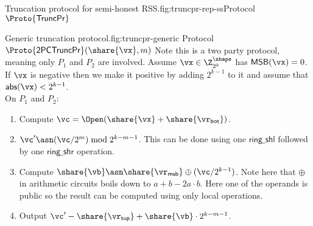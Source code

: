 \begin{Boxfig}{Truncation protocol for semi-honest
RSS.}{fig:truncpr-rep-ss}{Protocol $\Proto{\mathsf{TruncPr}}$}
\end{Boxfig}

\begin{Boxfig}{Generic truncation protocol.}{fig:truncpr-generic}
  {Protocol $\Proto{\mathsf{2PCTruncPr}}(\share{\vx}, m)$}
  Note this is a two party protocol, meaning only $P_1$ and $P_2$ are involved.
  Assume $\vx \in \Z_{2^k}^{\shape}$ has $\mathsf{MSB}(\vx) = 0$. If $\vx$ is negative then
  we make it positive by adding $2^{k-1}$ to it and assume that $\mathsf{abs}(\vx) < 2^{k-1}$.
  \\
  On $P_1$ and $P_2$:
  \begin{enumerate}
    \item Compute $\vc = \Open(\share{\vx} + \share{\vr_{\mathsf{bot}}})$.
    \item $\vc' \asn (\vc/2^m) \bmod 2^{k-m-1}$. This can be done using one $\mathsf{ring\_shl}$
    followed by one $\mathsf{ring\_shr}$ operation.
    \item Compute $\share{\vb} \asn \share{\vr_{\mathsf{msb}}} \oplus (\vc / 2^{k-1})$. Note here that $\oplus$
    in arithmetic circuits boils down to $a + b - 2a\cdot b$. Here one of the operands is public so
    the result can be computed using only local operations.
    \item Output $\vc' - \share{\vr_{\mathsf{top}}} + \share{\vb} \cdot 2^{k-m-1}$.
 \end{enumerate}

\end{Boxfig}


